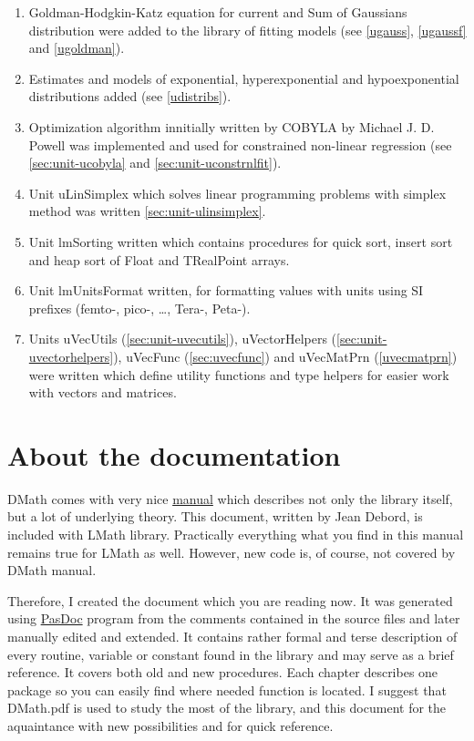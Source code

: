 \documentclass[12pt,a4paper,oneside]{report}
\begin{document}
\begin{enumerate}
\item Goldman-Hodgkin-Katz equation for current and Sum of Gaussians distribution were added to the library of fitting models (see \ref{ugauss}, \ref{ugaussf} and \ref{ugoldman}).
\item Estimates and models of exponential, hyperexponential and hypoexponential distributions added (see \ref{udistribs}).
\item Optimization algorithm innitially written by COBYLA by Michael J. D. Powell was implemented and used for constrained non-linear regression (see \ref{sec:unit-ucobyla} and \ref{sec:unit-uconstrnlfit}).
\item Unit uLinSimplex which solves linear programming problems with simplex method was written \ref{sec:unit-ulinsimplex}.
\item Unit lmSorting written which contains procedures for quick sort, insert sort and heap sort of Float and TRealPoint arrays.
\item Unit lmUnitsFormat written, for formatting values with units using SI prefixes (femto-, pico-, \dots, Tera-, Peta-).
\item Units uVecUtils (\ref{sec:unit-uvecutils}), uVectorHelpers (\ref{sec:unit-uvectorhelpers}), uVecFunc (\ref{sec:uvecfunc}) and uVecMatPrn (\ref{uvecmatprn}) were written which define utility functions and type helpers for easier work with vectors and matrices.
  
\end{enumerate}
\section*{About the documentation} 
DMath comes with very nice \href{DMath.pdf}{manual} which describes not only the library itself, but a lot of underlying theory. This document, written by Jean Debord, is included with LMath library. Practically everything what you find in this manual remains true for LMath as well. However, new code is, of course, not covered by DMath manual. 

Therefore, I created the document which you are reading now. It was generated using \href{https://sourceforge.net/projects/pasdoc/}{PasDoc} program from the comments contained in the source files and later manually edited and extended. It contains rather formal and terse description of every routine, variable or constant found in the library and may serve as a brief reference. It covers both old and new procedures. Each chapter describes one package so you can easily find where needed function is located. I suggest that DMath.pdf is used to study the most of the library, and this document for the aquaintance with new possibilities and for quick reference.
\end{document}
